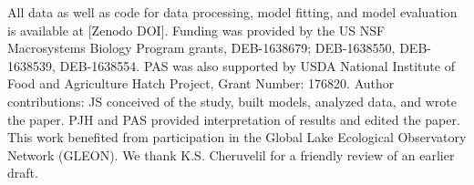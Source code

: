 \documentclass[draft]{agujournal2019}
\begin{document}
%
%

%

%



%
%
%
%
%
%
%
%

\acknowledgments All data as well as code for data processing, model fitting, and model evaluation is available at [Zenodo DOI]. Funding was provided by the US NSF Macrosystems Biology Program grants, DEB-1638679; DEB-1638550, DEB-1638539, DEB-1638554. PAS was also supported by USDA National Institute of Food and Agriculture Hatch Project, Grant Number: 176820. Author contributions: JS conceived of the study, built models, analyzed data, and wrote the paper. PJH and PAS provided interpretation of results and edited the paper. This work benefited from participation in the Global Lake Ecological Observatory Network (GLEON). We thank K.S. Cheruvelil for a friendly review of an earlier draft.
\end{document}
